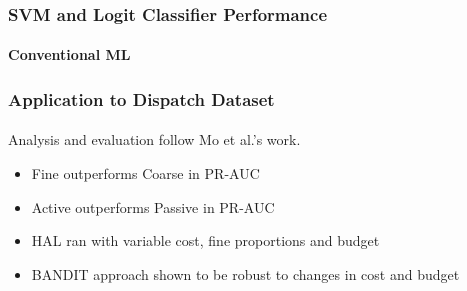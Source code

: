 \documentclass{beamer}
\begin{document}
\begin{frame}[noframenumbering]
    \frametitle{SVM and Logit Classifier Performance}  %
    \framesubtitle{Conventional ML}
    \begin{table}[H]
    \centering
    \caption{Logit results after parameter tuning:}
    \label{tab:LogRegAll-Wt23}
    \end{table}
    \begin{table}[H]
    \centering
    \caption{SVM results after parameter tuning:}
    \label{tab:SVM-All}
    \end{table}
\end{frame}
\begin{frame}[noframenumbering]
    \frametitle{Application to Dispatch Dataset}  %
    \framesubtitle{}
    \par Analysis and evaluation follow Mo et al.'s work.
    \begin{itemize}
      \item Fine outperforms Coarse in PR-AUC
      \item Active outperforms Passive in PR-AUC
      \item HAL ran with variable cost, fine proportions and budget
      \item BANDIT approach shown to be robust to changes in cost and budget
    \end{itemize}
\end{frame}
\end{document}
